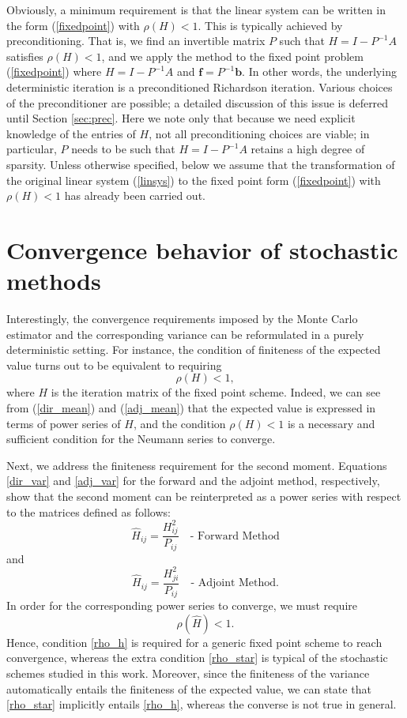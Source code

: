 \documentclass[final,leqno,onefignum,onetabnum]{siamltex1213}
\begin{document}
Obviously, a minimum requirement is that the linear system can be written
in the form (\ref{fixedpoint}) with $\rho(H) < 1$. This is typically achieved by
preconditioning. That is, we find an invertible matrix $P$ such that $H = I - P^{-1}A$
satisfies $\rho(H) < 1$, and we apply the method to the fixed point problem
(\ref{fixedpoint}) where $H = I - P^{-1}A$ and $\mathbf{f} = P^{-1}\mathbf{b}$. In
other words, the underlying deterministic iteration is a preconditioned
Richardson iteration. Various choices of the preconditioner are possible;
a detailed discussion of this issue is deferred until Section \ref{sec:prec}.
Here we note only that because we need explicit
knowledge of the entries of $H$, not all preconditioning choices are
viable; in particular, $P$ needs to be such that $H = I - P^{-1}A$ retains
a high degree of sparsity. Unless otherwise specified, below we
assume that the transformation of the original linear system (\ref{linsys})
to the fixed point form (\ref{fixedpoint}) with $\rho(H)<1$ has already
been carried out.

\section{Convergence behavior of stochastic methods}
\label{sec:convergence}

Interestingly,
the convergence requirements imposed by the Monte Carlo estimator and
the corresponding variance can be reformulated in a purely deterministic
setting.
For instance, the condition of finiteness of the expected value turns out to
be equivalent to requiring
\begin{equation}
 \rho(H)<1
 \label{rho_h},
\end{equation}
where $H$ is the iteration matrix of the fixed point scheme.
Indeed, we can see from (\ref{dir_mean}) and (\ref{adj_mean}) that the
expected value is expressed in terms of
power series of $H$, and the condition $\rho(H)<1$
is a necessary and sufficient condition for the Neumann series to
converge.

Next, we address the finiteness requirement for the second moment.
Equations \eqref{dir_var} and \eqref{adj_var}
for
the forward and the adjoint method, respectively, show that the second
moment can be reinterpreted as a power series with respect to the matrices
defined as follows:
\[
 \hat{H}_{ij}=\frac{H_{ij}^2}{P_{ij}} \quad \text{- Forward Method}
\]
and
\[
 \hat{H}_{ij}=\frac{H_{ji}^2}{P_{ij}} \quad \text{- Adjoint Method}.
\]
In order for the corresponding power series to
converge, we must require
\begin{equation}
 \rho(\hat{H})<1.
 \label{rho_star}
\end{equation}
Hence, condition \eqref{rho_h} is required for a generic fixed point scheme to
reach convergence, whereas the extra condition \eqref{rho_star} is typical of
the stochastic schemes studied in this work.
Moreover, since the finiteness of the variance automatically entails the
finiteness of the expected value, we can state that \eqref{rho_star}
implicitly entails \eqref{rho_h}, whereas the converse is not true in
general.
\end{document}
